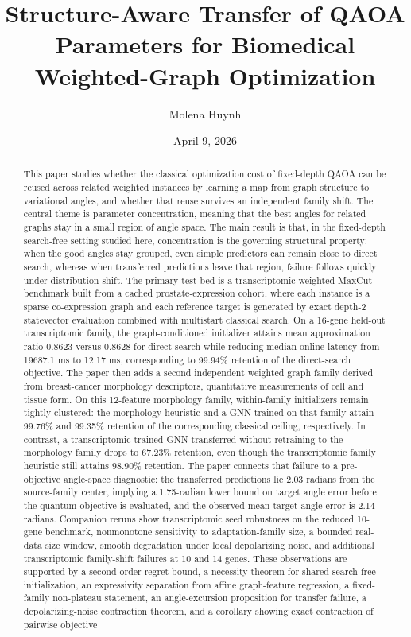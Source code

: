 \documentclass[
  reprint,
  twocolumn,
  aps,
  superscriptaddress,
  longbibliography,
  floatfix
]{revtex4-2}
\begin{document}
\title{Structure-Aware Transfer of QAOA Parameters for Biomedical Weighted-Graph Optimization}

\author{Molena Huynh}

\date{April 9, 2026}

\begin{abstract}
This paper studies whether the classical optimization cost of fixed-depth QAOA can be reused across related weighted instances by learning a map from graph structure to variational angles, and whether that reuse survives an independent family shift. The central theme is parameter concentration, meaning that the best angles for related graphs stay in a small region of angle space. The main result is that, in the fixed-depth search-free setting studied here, concentration is the governing structural property: when the good angles stay grouped, even simple predictors can remain close to direct search, whereas when transferred predictions leave that region, failure follows quickly under distribution shift. The primary test bed is a transcriptomic weighted-MaxCut benchmark built from a cached prostate-expression cohort, where each instance is a sparse co-expression graph and each reference target is generated by exact depth-2 statevector evaluation combined with multistart classical search. On a 16-gene held-out transcriptomic family, the graph-conditioned initializer attains mean approximation ratio 0.8623 versus 0.8628 for direct search while reducing median online latency from 19687.1 ms to 12.17 ms, corresponding to 99.94\% retention of the direct-search objective. The paper then adds a second independent weighted graph family derived from breast-cancer morphology descriptors, quantitative measurements of cell and tissue form. On this 12-feature morphology family, within-family initializers remain tightly clustered: the morphology heuristic and a GNN trained on that family attain 99.76\% and 99.35\% retention of the corresponding classical ceiling, respectively. In contrast, a transcriptomic-trained GNN transferred without retraining to the morphology family drops to 67.23\% retention, even though the transcriptomic family heuristic still attains 98.90\% retention. The paper connects that failure to a pre-objective angle-space diagnostic: the transferred predictions lie 2.03 radians from the source-family center, implying a 1.75-radian lower bound on target angle error before the quantum objective is evaluated, and the observed mean target-angle error is 2.14 radians. Companion reruns show transcriptomic seed robustness on the reduced 10-gene benchmark, nonmonotone sensitivity to adaptation-family size, a bounded real-data size window, smooth degradation under local depolarizing noise, and additional transcriptomic family-shift failures at 10 and 14 genes. These observations are supported by a second-order regret bound, a necessity theorem for shared search-free initialization, an expressivity separation from affine graph-feature regression, a fixed-family non-plateau statement, an angle-excursion proposition for transfer failure, a depolarizing-noise contraction theorem, and a corollary showing exact contraction of pairwise objective 
\end{abstract}
\end{document}
